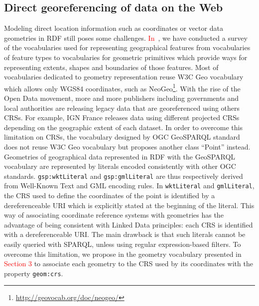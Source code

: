 \subsection{Direct georeferencing of data on the Web}
\label{sec:directgeo}
Modeling direct location information such as coordinates or vector data geometries in RDF still poses some challenges. \textcolor{red}{In~\cite{Atemezing:TC12}}, we have conducted a survey of the vocabularies used for representing geographical features from vocabularies of feature types to vocabularies for geometric primitives which provide ways for representing extents, shapes and boundaries of those features. 
Most of vocabularies dedicated to geometry representation reuse W3C Geo vocabulary which allows only WGS84 coordinates, such as NeoGeo\footnote{\url{http://geovocab.org/doc/neogeo/}}. With the rise of the Open Data movement, more and more publishers including governments and local authorities are releasing legacy data that are georeferenced using others CRSs. For example, IGN France releases data using different projected CRSs depending on the geographic extent of each dataset. In order to overcome this limitation on CRSs, the vocabulary designed by OGC GeoSPARQL standard  does not reuse W3C Geo vocabulary but proposes another class ``Point'' instead. Geometries of geographical data represented in RDF with the GeoSPARQL vocabulary are represented by literals encoded consistently with other OGC standards. \texttt{gsp:wktLiteral} and \texttt{gsp:gmlLiteral} are thus respectively derived from Well-Known Text and GML encoding rules. In \texttt{wktLiteral} and \texttt{gmlLiteral}, the CRS used to define the coordinates of the point is identified by a dereferenceable URI which is explicitly stated at the beginning of the literal. This way of associating coordinate reference systems with geometries has the advantage of being consistent with Linked Data principles: each CRS is identified with a dereferenceable URI. The main drawback is that such literals cannot be easily queried with SPARQL, unless using regular expression-based filters.  To overcome this limitation, we propose in the geometry vocabulary presented in \textcolor{red}{Section 3} to associate each geometry to the CRS used by its coordinates with the property \texttt{geom:crs}.

